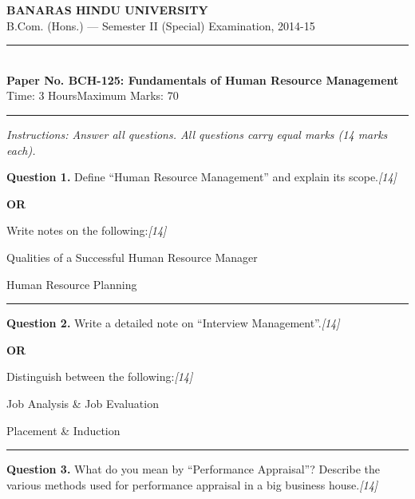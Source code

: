 \documentclass[11pt,a4paper]{article}
\newcommand{\pts}[1]{\hfill   \textit{[#1]}}
\begin{document}
\begin{center}
  {\large\bfseries BANARAS HINDU UNIVERSITY}\\[2pt]
  {\normalsize B.Com. (Hons.) --- Semester II (Special) Examination, 2014-15}\\[6pt]
  \rule{0.8\linewidth}{0.5pt}\\[6pt]
  {\large\bfseries Paper No. BCH-125: Fundamentals of Human Resource Management}\\[4pt]
  {\normalsize Time: 3 Hours\hfill Maximum Marks: 70}
\end{center}

\rule{\linewidth}{0.4pt}

\smallskip



\noindent   \textit{Instructions: Answer all questions. All questions carry equal marks (14 marks each).}

\bigskip




\noindent   \textbf{Question 1.}
Define ``Human Resource Management'' and explain its scope.\pts{14}

\centerline{   \textbf{OR}}

Write notes on the following:\pts{14}

\begin{parts}
  \item Qualities of a Successful Human Resource Manager
  \item Human Resource Planning
\end{parts}

\medskip\rule{\linewidth}{0.2pt}




\noindent   \textbf{Question 2.}
Write a detailed note on ``Interview Management''.\pts{14}

\centerline{   \textbf{OR}}

Distinguish between the following:\pts{14}

\begin{parts}
  \item Job Analysis \& Job Evaluation
  \item Placement \& Induction
\end{parts}

\medskip\rule{\linewidth}{0.2pt}




\noindent   \textbf{Question 3.}
What do you mean by ``Performance Appraisal''? Describe the various methods used for performance appraisal in a big business house.\pts{14}
\end{document}

